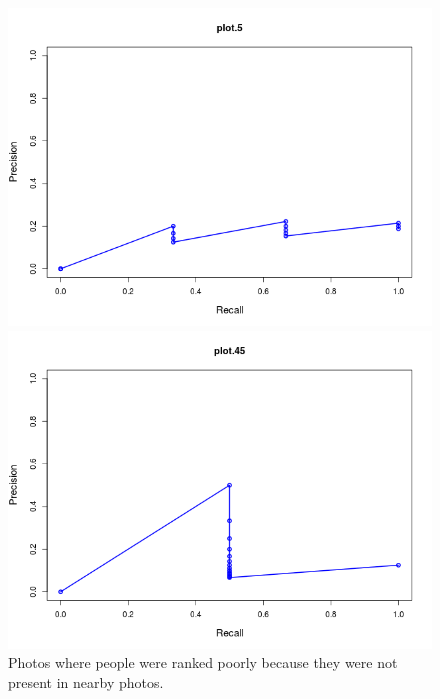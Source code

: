 \begin{figure}[t]
\begin{minipage}[b]{0.5\linewidth}
\centering
\includegraphics[width=\textwidth]{media/chapter6/pr-graphs/plot-5.png}
\end{minipage}
\hspace{0.5cm}
\begin{minipage}[b]{0.5\linewidth}
\centering
\includegraphics[width=\textwidth]{media/chapter6/pr-graphs/plot-45.png}
\end{minipage}
\caption{Photos where people were ranked poorly because they were not present in nearby photos.}
\label{fig:poor}

\end{figure}

